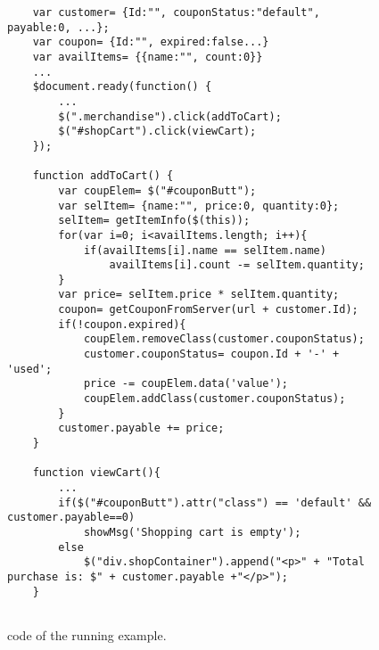 \begin{figure}
\begin{lstlisting}
	var customer= {Id:"", couponStatus:"default", payable:0, ...};
	var coupon= {Id:"", expired:false...}
	var availItems= {{name:"", count:0}}
	...
	$document.ready(function() {
		...	
		$(".merchandise").click(addToCart);
		$("#shopCart").click(viewCart);
	});
	
	function addToCart() {
		var coupElem= $("#couponButt");
		var selItem= {name:"", price:0, quantity:0};
		selItem= getItemInfo($(this));
		for(var i=0; i<availItems.length; i++){
			if(availItems[i].name == selItem.name)
				availItems[i].count -= selItem.quantity;		
		}
		var price= selItem.price * selItem.quantity;
		coupon= getCouponFromServer(url + customer.Id);
		if(!coupon.expired){
			coupElem.removeClass(customer.couponStatus);
			customer.couponStatus= coupon.Id + '-' + 'used';
			price -= coupElem.data('value');	
			coupElem.addClass(customer.couponStatus);	
		} 	
		customer.payable += price;
	}

	function viewCart(){
		...
		if($("#couponButt").attr("class") == 'default' && customer.payable==0)
			showMsg('Shopping cart is empty');
		else
			$("div.shopContainer").append("<p>" + "Total purchase is: $" + customer.payable +"</p>");
	}


\end{lstlisting}
\vspace{-0.1in} 

\caption{\javascript code of the running example.}
\label{Fig:example}
\vspace{-0.2in} 

\end{figure}